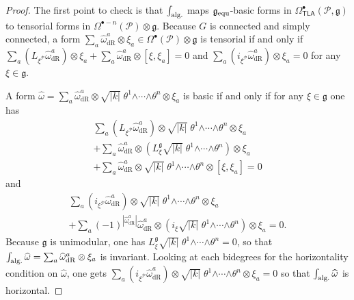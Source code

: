 \documentclass[number]{elsarticle}
\theoremstyle{definition}
\theoremstyle{remark}
\numberwithin{equation}{section}
\begin{document}
\begin{proof}
The first point to check is that $\int_{{\text{\textup{alg.}}}}$ maps ${{\mathfrak g}}_{{\text{\textup{equ}}}}$-basic forms in $\Omega^{\bullet}_{{{{\mathbf{\mathsf{{TLA}}}}}}}({{{{\mathcal{{P}}}}}},{{\mathfrak g}})$ to tensorial forms in $\Omega^{{\bullet}-n}({{{{\mathcal{{P}}}}}}) \otimes {{\mathfrak g}}$. Because $G$ is connected and simply connected, a form $\sum_a {\widehat{\omega}}^a_{{\text{dR}}} \otimes \xi_a \in \Omega^{\bullet}({{{{\mathcal{{P}}}}}}) \otimes {{\mathfrak g}}$ is tensorial if and only if $ \sum_a (L_{\xi^{{{{\mathcal{{P}}}}}}} {\widehat{\omega}}^a_{{\text{dR}}}) \otimes \xi_a + \sum_a {\widehat{\omega}}^a_{{\text{dR}}} \otimes [\xi, \xi_a] = 0$ and $ \sum_a (i_{\xi^{{{{\mathcal{{P}}}}}}}{\widehat{\omega}}^a_{{\text{dR}}}) \otimes \xi_a = 0$ for any $\xi \in {{\mathfrak g}}$.

A form ${\widehat{\omega}} = \sum_a {\widehat{\omega}}^a_{{\text{dR}}} \otimes \sqrt{|k|}\; \theta^1 {\mathord{\wedge}} \cdots {\mathord{\wedge}} \theta^n \otimes \xi_a$ is basic if and only if for any $\xi \in {{\mathfrak g}}$ one has
\begin{multline*}
\sum_a (L_{\xi^{{{{\mathcal{{P}}}}}}} {\widehat{\omega}}^a_{{\text{dR}}}) \otimes \sqrt{|k|}\; \theta^1 {\mathord{\wedge}} \cdots {\mathord{\wedge}} \theta^n \otimes \xi_a 
\\
+ 
\sum_a {\widehat{\omega}}^a_{{\text{dR}}} \otimes (L^{{\mathfrak g}}_\xi \sqrt{|k|}\; \theta^1 {\mathord{\wedge}} \cdots {\mathord{\wedge}} \theta^n )\otimes \xi_a
\\
+
\sum_a {\widehat{\omega}}^a_{{\text{dR}}} \otimes \sqrt{|k|}\; \theta^1 {\mathord{\wedge}} \cdots {\mathord{\wedge}} \theta^n \otimes [\xi,\xi_a] = 0
\end{multline*}
and
\begin{multline*}
\sum_a (i_{\xi^{{{{\mathcal{{P}}}}}}}{\widehat{\omega}}^a_{{\text{dR}}}) \otimes \sqrt{|k|}\; \theta^1 {\mathord{\wedge}} \cdots {\mathord{\wedge}} \theta^n \otimes \xi_a
\\
+
\sum_a (-1)^{|{\widehat{\omega}}^a_{{\text{dR}}}|} {\widehat{\omega}}^a_{{\text{dR}}} \otimes (i_\xi \sqrt{|k|}\; \theta^1 {\mathord{\wedge}} \cdots {\mathord{\wedge}} \theta^n ) \otimes \xi_a
=0.
\end{multline*}
Because ${{\mathfrak g}}$ is unimodular, one has $L^{{\mathfrak g}}_\xi \sqrt{|k|}\; \theta^1 {\mathord{\wedge}} \cdots {\mathord{\wedge}} \theta^n = 0$, so that $\int_{{\text{\textup{alg.}}}} {\widehat{\omega}} = \sum_a {\widehat{\omega}}^a_{{\text{dR}}} \otimes \xi_a$ is invariant. Looking at each bidegrees for the horizontality condition on ${\widehat{\omega}}$, one gets $\sum_a (i_{\xi^{{{{\mathcal{{P}}}}}}}{\widehat{\omega}}^a_{{\text{dR}}}) \otimes \sqrt{|k|}\; \theta^1 {\mathord{\wedge}} \cdots {\mathord{\wedge}} \theta^n \otimes \xi_a = 0$ so that $\int_{{\text{\textup{alg.}}}} {\widehat{\omega}}$ is horizontal.


\end{proof}
\end{document}
